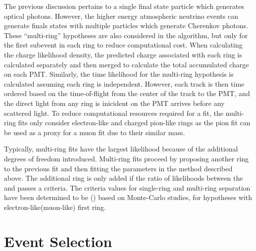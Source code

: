 The previous discussion pertains to a single final state particle which generates optical photons. However, the higher energy atmospheric neutrino events can generate finals states with multiple particles which generate Cherenkov photons. These ``multi-ring'' hypotheses are also considered in the \fq algorithm, but only for the first subevent in each ring to reduce computational cost. When calculating the charge likelihood density, the predicted charge associated with each ring is calculated separately and then merged to calculate the total accumulated charge on each PMT. Similarly, the time likelihood for the multi-ring hypothesis is calculated assuming each ring is independent. However, each track is then time ordered based on the time-of-flight from the center of the track to the PMT, and the direct light from any ring is inicident on the PMT arrives before any scattered light. To reduce computational resources required for a fit, the multi-ring fits only consider electron-like and charged pion-like rings as the pion fit can be used as a proxy for a muon fit due to their similar mass.

Typically, multi-ring fits have the largest likelihood because of the additional degrees of freedom introduced. Multi-ring fits proceed by proposing another ring to the previous fit and then fitting the parameters in the method described above. The additional ring is only added if the ratio of likelihoods between the  and  passes a criteria. The criteria values for single-ring and multi-ring separation have been determined to be () based on Monte-Carlo studies, for hypotheses with electron-like(muon-like) first ring.

\section{Event Selection}
\label{sec:Selections_Selection}
